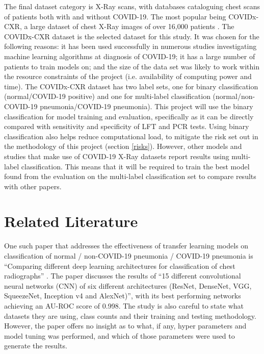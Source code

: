 The final dataset category is X-Ray scans, with databases cataloguing chest scans of patients both with and without COVID-19. The most popular being COVIDx-CXR, a large dataset of chest X-Ray images of over 16,000 patients \citep{wang2020covid}. The COVIDx-CXR dataset is the selected dataset for this study. It was chosen for the following reasons: it has been used successfully in numerous studies investigating machine learning algorithms at diagnosis of COVID-19; it has a large number of patients to train models on; and the size of the data set was likely to work within the resource constraints of the project (i.e. availability of computing power and time). The COVIDx-CXR dataset has two label sets, one for binary classification (normal/COVID-19 positive) and one for multi-label classification (normal/non-COVID-19 pneumonia/COVID-19 pneumonia). This project will use the binary classification for model training and evaluation, specifically as it can be directly compared with sensitivity and specificity of LFT and PCR tests. Using binary classification also helps reduce computational load, to mitigate the risk set out in the methodology of this project (section \ref{risks}). However, other models and studies that make use of COVID-19 X-Ray datasets report results using multi-label classification. This means that it will be required to train the best model found from the evaluation on the multi-label classification set to compare results with other papers.

\section{Related Literature}
One such paper that addresses the effectiveness of transfer learning models on classification of normal / non-COVID-19 pneumonia / COVID-19 pneumonia is “Comparing different deep learning architectures for classification of chest radiographs” \citep{bressem2020comparing}. The paper discusses the results of “15 different convolutional neural networks (CNN) of six different architectures (ResNet, DenseNet, VGG, SqueezeNet, Inception v4 and AlexNet)”, with its best performing networks achieving an AU-ROC score of 0.998. The study is also careful to state what datasets they are using, class counts and their training and testing methodology. However, the paper offers no insight as to what, if any, hyper parameters and model tuning was performed, and which of those parameters were used to generate the results. 

